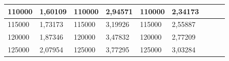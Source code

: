 \documentclass[11pt,openany]{book}
\begin{document}
\begin{table}[!ht]
\begin{tabular}{|l|l|l|l|l|l|l|l|}
        110000                                            & 1,60109                                            & 110000                                              & 2,94571                                             & 110000          & 2,34173         & ~               & ~               \\ \hline
        115000                                            & 1,73173                                            & 115000                                              & 3,19926                                             & 115000          & 2,55887         & ~               & ~               \\ \hline
        120000                                            & 1,87346                                            & 120000                                              & 3,47832                                             & 120000          & 2,77209         & ~               & ~               \\ \hline
        125000                                            & 2,07954                                            & 125000                                              & 3,77295                                             & 125000          & 3,03284         & ~               &                 \\\hline
    \end{tabular}
\end{table}
\end{document}
